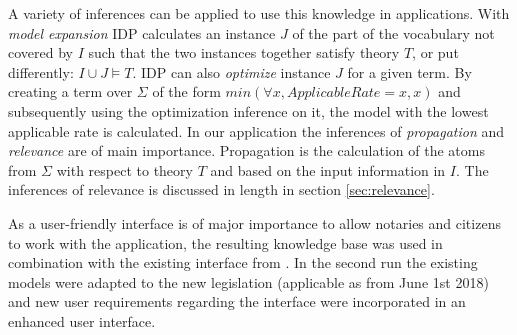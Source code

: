 A variety of inferences can be applied to use this knowledge in applications.
With \textit{model expansion} IDP calculates an instance $J$ of the part of the vocabulary not covered by $I$ such that the two instances together satisfy theory $T$, or put differently: $I\cup J \models T$.
IDP can also \textit{optimize} instance $J$ for a given term.
By creating a term over $\Sigma$ of the form ${ min(\forall x, ApplicableRate = x, x)}$ and subsequently using the optimization inference on it, the model with the lowest applicable rate is calculated.
In our application the inferences of \textit{propagation} and \textit{relevance} are of main importance. 
Propagation is the calculation of the atoms from $\Sigma$ with respect to theory $T$ and based on the input information in $I$.
The inferences of relevance is discussed in length in section \ref{sec:relevance}.

As a user-friendly interface is of major importance to allow notaries and citizens to work with the application, the resulting knowledge base was used in combination with the existing interface from \cite{Ingmar}.
In the second run the existing models were adapted to the new legislation (applicable as from June 1st 2018) and new user requirements regarding the interface were incorporated in an enhanced user interface.



